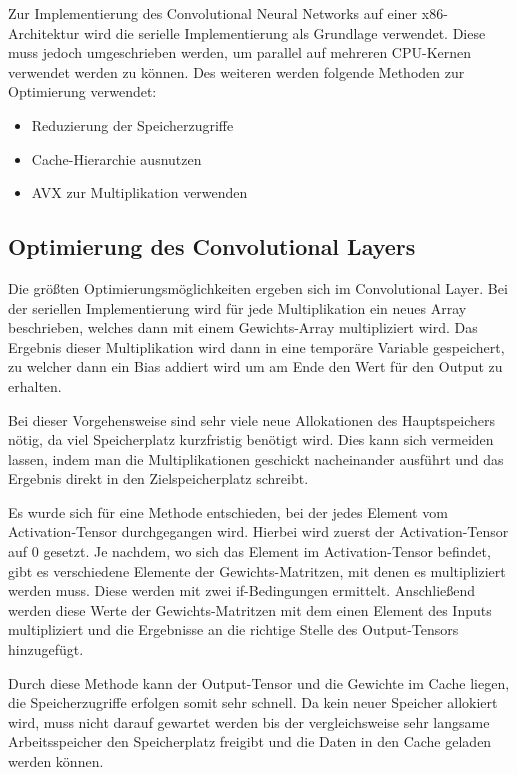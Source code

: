 \documentclass[../main.tex]{subfiles}
\begin{document}
Zur Implementierung des Convolutional Neural Networks auf einer x86-Architektur wird die serielle Implementierung als Grundlage verwendet. Diese muss jedoch umgeschrieben werden, um parallel auf mehreren CPU-Kernen verwendet werden zu können. Des weiteren werden folgende Methoden zur Optimierung verwendet:
\begin{itemize}
	\item Reduzierung der Speicherzugriffe
	\item Cache-Hierarchie ausnutzen
	\item AVX zur Multiplikation verwenden
\end{itemize}

\subsection{Optimierung des Convolutional Layers}

Die größten Optimierungsmöglichkeiten ergeben sich im Convolutional Layer. Bei der seriellen Implementierung wird für jede Multiplikation ein neues Array beschrieben, welches dann mit einem Gewichts-Array multipliziert wird. Das Ergebnis dieser Multiplikation wird dann in eine temporäre Variable gespeichert, zu welcher dann ein Bias addiert wird um am Ende den Wert für den Output zu erhalten.

Bei dieser Vorgehensweise sind sehr viele neue Allokationen des Hauptspeichers nötig, da viel Speicherplatz kurzfristig benötigt wird. Dies kann sich vermeiden lassen, indem man die Multiplikationen geschickt nacheinander ausführt und das Ergebnis direkt in den Zielspeicherplatz schreibt. 

Es wurde sich für eine Methode entschieden, bei der jedes Element vom Activation-Tensor durchgegangen wird. Hierbei wird zuerst der Activation-Tensor auf 0 gesetzt. Je nachdem, wo sich das Element im Activation-Tensor befindet, gibt es verschiedene Elemente der Gewichts-Matritzen, mit denen es multipliziert werden muss. Diese werden mit zwei if-Bedingungen ermittelt. Anschließend werden diese Werte der Gewichts-Matritzen mit dem einen Element des Inputs multipliziert und die Ergebnisse an die richtige Stelle des Output-Tensors hinzugefügt.

Durch diese Methode kann der Output-Tensor und die Gewichte im Cache liegen, die Speicherzugriffe erfolgen somit sehr schnell. Da kein neuer Speicher allokiert wird, muss nicht darauf gewartet werden bis der vergleichsweise sehr langsame Arbeitsspeicher den Speicherplatz freigibt und die Daten in den Cache geladen werden können. 
\end{document}
